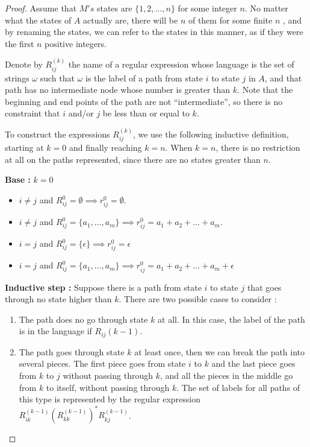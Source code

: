 \documentclass[a4paper,11pt]{article}
\begin{document}
\begin{proof}
  Assume that $M's$ states are $\{1,2,\dots,n\}$ for some integer $n$. No
  matter what the states of $A$ actually are, there will be $n$ of them for some finite
  $n$ , and by renaming the states, we can refer to the states in this manner, as if
  they were the first $n$ positive integers.

  Denote by $R_{ij}^{(k)}$ the name of a regular expression whose language is the
  set of strings $\omega$ such that $\omega$ is the label of a path from state $i$
  to state $j$ in $A$, and that path has no intermediate node whose number is
  greater than $k$. Note that the beginning and end points of the path are not
  ``intermediate'', so there is no constraint that $i$ and/or $j$ be less than or
  equal to $k$.

  To construct the expressions $R_{ij}^{(k)}$, we use the following inductive
  definition, starting at $k=0$ and finally reaching $k=n$. When $k = n$, there is
  no restriction at all on the paths represented, since there are no states
  greater than $n$.

  \textbf{Base : } $k = 0$
  \begin{itemize}
  \item $i \neq j$ and $R_{ij}^0 = \emptyset \implies r_{ij}^0 = \emptyset$.
  \item $i \neq j$ and $R_{ij}^0 = \{a_1,\dots,a_m\} \implies r_{ij}^0 = a_1 + a_2
    + \dots + a_m$.
  \item $i = j$ and  $R_{ij}^0 = \{\epsilon\} \implies r_{ij}^0 = \epsilon$
  \item $i = j$ and $R_{ij}^0 = \{a_1,\dots,a_m\} \implies r_{ij}^0 = a_1 + a_2 +
    \dots + a_m + \epsilon$
  \end{itemize}

  \textbf{Inductive step : } Suppose there is a path from state $i$ to state $j$
  that goes through no state higher than $k$. There are two possible cases to
  consider :

  \begin{enumerate}
  \item The path does no go through state $k$ at all. In this case, the label of
    the path is in the language if $R_{ij}(k-1)$.
  \item The path goes through state $k$ at least once, then we can break the path
    into several pieces. The first piece goes from state $i$ to $k$ and the last
    piece goes from $k$ to $j$ without passing through $k$, and all the pieces in
    the middle go from $k$ to itself, without passing through $k$. The set of
    labels for all paths of this type is represented by the regular expression
    $R_{ik}^{(k-1)}(R_{kk}^{(k-1)})^* R_{kj}^{(k-1)}$.
  \end{enumerate}


\end{proof}
\end{document}

